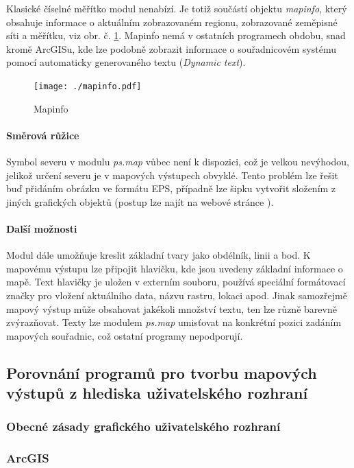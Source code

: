 \documentclass[a4paper,12pt,draft]{article}
\newcommand{\modul}[1]{\emph{#1}}
\begin{document}
Klasické číselné měřítko modul nenabízí. Je totiž součástí
objektu \emph{mapinfo}, který obsahuje informace o aktuálním
zobrazovaném regionu, zobrazované zeměpisné síti a měřítku, viz
obr. č. \ref{fig:mapinfo}. Mapinfo nemá v ostatních programech obdobu,
snad kromě ArcGISu, kde lze podobně zobrazit informace o souřadnicovém
systému pomocí automaticky generovaného textu (\emph{Dynamic text}).
\begin{figure}[h!]
    \centering
    \texttt{[image: ./mapinfo.pdf]}
    \caption{Mapinfo}
    \label{fig:mapinfo}
\end{figure}

\paragraph*{Směrová růžice}
Symbol severu v modulu \modul{ps.map} vůbec není k dispozici, což je velkou
nevýhodou, jelikož určení severu je v mapových výstupech obvyklé. Tento
problém lze řešit buď přidáním obrázku ve formátu EPS, případně
lze šipku vytvořit složením z jiných grafických objektů (postup lze
najít na webové stránce \cite{wiki_psmap_north}).

\paragraph*{Další možnosti}
Modul dále umožňuje kreslit základní tvary jako obdélník, linii a
bod. K mapovému výstupu lze připojit hlavičku, kde jsou uvedeny základní
informace o mapě. Text hlavičky je uložen v externím souboru, používá
speciální formátovací značky pro vložení aktuálního data, názvu
rastru, lokaci apod. Jinak samozřejmě mapový výstup může obsahovat
jakékoli množství textu, ten lze různě barevně zvýrazňovat. Texty lze
modulem \modul{ps.map} umisťovat na konkrétní pozici zadáním mapových
souřadnic, což ostatní programy nepodporují.




\subsection{Porovnání programů pro tvorbu mapových výstupů z hlediska
uživatelského rozhraní }
\subsubsection{Obecné zásady grafického uživatelského rozhraní}
\subsubsection{ArcGIS}
\end{document}
